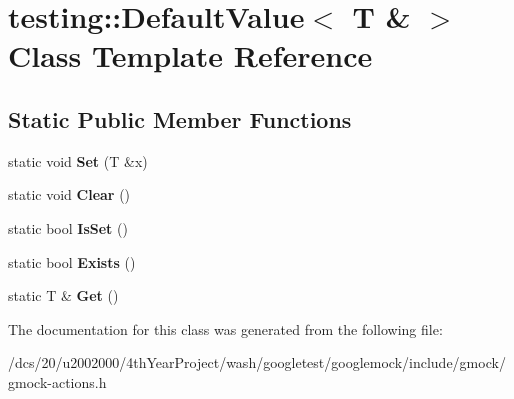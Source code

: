 \hypertarget{classtesting_1_1DefaultValue_3_01T_01_6_01_4}{}\section{testing\+:\+:Default\+Value$<$ T \& $>$ Class Template Reference}
\label{classtesting_1_1DefaultValue_3_01T_01_6_01_4}
\subsection*{Static Public Member Functions}
\begin{DoxyCompactItemize}
\item 
\mbox{\label{classtesting_1_1DefaultValue_3_01T_01_6_01_4_a9863abf3d311ce5007d7e57dfce2f252}} 
static void {\bfseries Set} (T \&x)
\item 
\mbox{\label{classtesting_1_1DefaultValue_3_01T_01_6_01_4_a3c8f9f81e591370f9b33798f58ca1a10}} 
static void {\bfseries Clear} ()
\item 
\mbox{\label{classtesting_1_1DefaultValue_3_01T_01_6_01_4_a3e61547c2f0141cc8004385f3a9c817d}} 
static bool {\bfseries Is\+Set} ()
\item 
\mbox{\label{classtesting_1_1DefaultValue_3_01T_01_6_01_4_a38420499e17d2fb4146ae6c4265f0d55}} 
static bool {\bfseries Exists} ()
\item 
\mbox{\label{classtesting_1_1DefaultValue_3_01T_01_6_01_4_a1310448dd8c171aecfcbf7c8df5de7bd}} 
static T \& {\bfseries Get} ()
\end{DoxyCompactItemize}


The documentation for this class was generated from the following file\+:\begin{DoxyCompactItemize}
\item 
/dcs/20/u2002000/4th\+Year\+Project/wash/googletest/googlemock/include/gmock/gmock-\/actions.\+h\end{DoxyCompactItemize}

